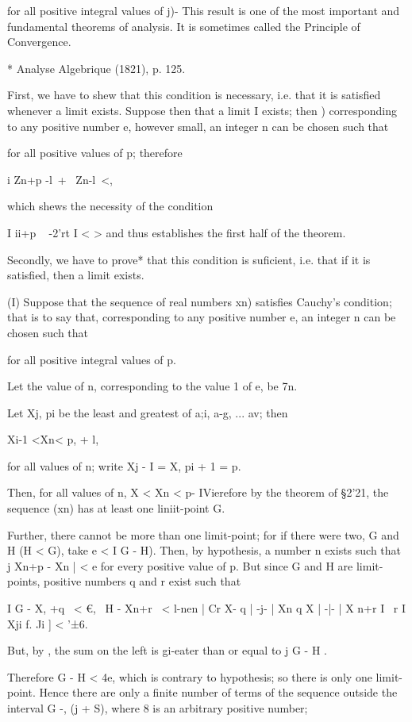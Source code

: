 for all positive integral values of j)- This result is one of the most
important and fundamental theorems of analysis. It is sometimes called
the Principle of Convergence.

* Analyse Algebrique (1821), p. 125.

%
%

First, we have to shew that this condition is necessary, i.e. that it
is satisfied whenever a limit exists. Suppose then that a limit I
exists; then ) corresponding to any positive number e, however
small, an integer n can be chosen such that

for all positive values of p; therefore

  i Zn+p -l\ + \ Zn-l\ <,

which shews the necessity of the condition

I ii+p ~ -2'rt I < > and thus establishes the first half of the
theorem.

Secondly, we have to prove* that this condition is suficient, i.e.
that if it is satisfied, then a limit exists.

(I) Suppose that the sequence of real numbers xn) satisfies Cauchy's
condition; that is to say that, corresponding to any positive number
e, an integer n can be chosen such that

for all positive integral values of p.

Let the value of n, corresponding to the value 1 of e, be 7n.

Let Xj, pi be the least and greatest of a;i, a-g, ... av; then

Xi-1 <Xn< p, + l,

for all values of n; write Xj - I = X, pi + 1 = p.

Then, for all values of n, X < Xn < p- IVierefore by the theorem of
§2'21, the sequence (xn) has at least one liniit-point G.

Further, there cannot be more than one limit-point; for if there were
two, G and H (H < G), take e < I G - H). Then, by hypothesis, a number
n exists such that j Xn+p - Xn | < e for every positive value of p.
But since G and H are limit-points, positive numbers q and r exist
such that

I G - X, +q \ < €, \ H - Xn+r \ < l-nen | Cr X- q | -j- | Xn q X | -|-
| X n+r I ~r I Xji f. Ji ] < '±6.

But, by , the sum on the left is gi-eater than or equal to j G -
H .

Therefore G - H < 4e, which is contrary to hypothesis; so there is
only one limit- point. Hence there are only a finite number of terms
of the sequence outside the interval G -, (j + S), where 8 is an
arbitrary positive number;


